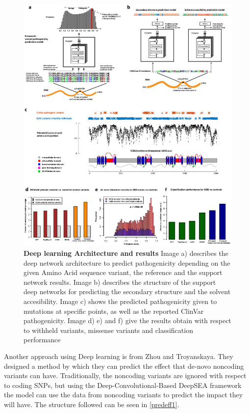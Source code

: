 \begin{figure}[!ht]
\centerline{\includegraphics[width=5in]{images/background/predHum.jpg}}
\caption{{\bf Deep learning Architecture and results\cite{Sundaram2018}} Image a) describes the deep network architecture to predict pathogenicity depending on the given Amino Acid sequence variant, the reference and the support network results. Image b) describes the structure of the support deep networks for predicting the secondary structure and the solvent accesibility. Image c) shows the predicted pathogenicity given to mutations at specific points, as well as the reported ClinVar pathogenicity.  Image d) e) and f) give the results obtain with respect to withheld variants, missense variants and classification performance}
\label{predHum1}
\end{figure}
\newpage
\clearpage
Another approach using Deep learning is from Zhou and Troyanskaya\cite{Zhou2017}. They designed a method by which they can predict the effect that de-novo noncoding variants can have. Traditionally, the noncoding variants are ignored with respect to coding SNPs, but using the Deep-Convolutional-Based DeepSEA framework the model can use the data from noncoding variants to predict the impact they will have. The structure followed can be seen in \ref{predeff1}.

